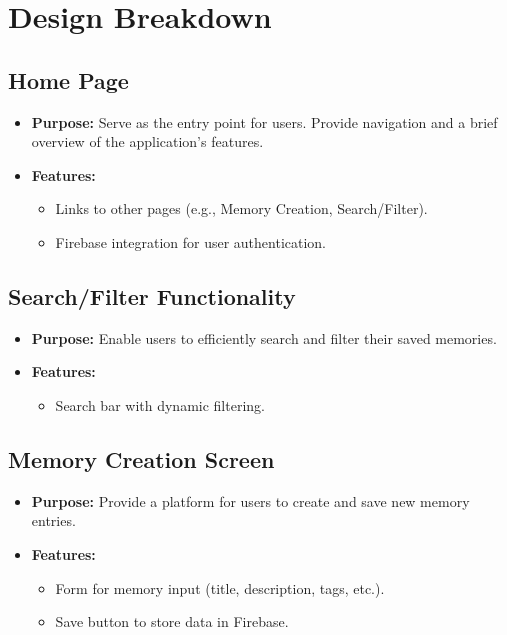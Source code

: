 \documentclass[12pt]{article}
\begin{document}
\section{Design Breakdown}

\subsection{Home Page}
\begin{itemize}
    \item \textbf{Purpose:} Serve as the entry point for users. Provide navigation and a brief overview of the application's features.
    \item \textbf{Features:}
    \begin{itemize}
        \item Links to other pages (e.g., Memory Creation, Search/Filter).
        \item Firebase integration for user authentication.
    \end{itemize}
\end{itemize}

\subsection{Search/Filter Functionality}
\begin{itemize}
    \item \textbf{Purpose:} Enable users to efficiently search and filter their saved memories.
    \item \textbf{Features:}
    \begin{itemize}
        \item Search bar with dynamic filtering.
    \end{itemize}
\end{itemize}

\subsection{Memory Creation Screen}
\begin{itemize}
    \item \textbf{Purpose:} Provide a platform for users to create and save new memory entries.
    \item \textbf{Features:}
    \begin{itemize}
        \item Form for memory input (title, description, tags, etc.).
        \item Save button to store data in Firebase.
    \end{itemize}
\end{itemize}
\end{document}
